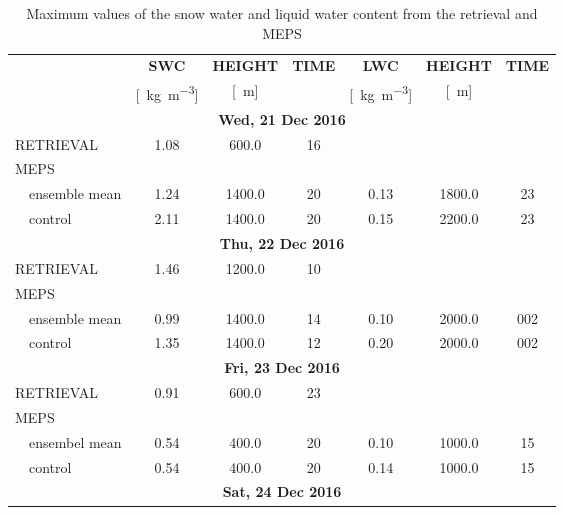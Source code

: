 \begin{table}[h!]
	\begin{center}
		\caption{Maximum values of the snow water and liquid water content from the retrieval and MEPS}\label{tab:max_val}
		\begin{tabular}{ll|c|c|c|c|c|c} 
			\hline \hline
			& & \textbf{SWC}  & \textbf{HEIGHT}  & \textbf{TIME} & \textbf{LWC}  & \textbf{HEIGHT}  & \textbf{TIME}  \\
			& & [\SI{}{\kg\per\cubic\meter}] & [\SI{}{\meter}] &  & [\SI{}{\kg\per\cubic\meter}] & [\SI{}{\meter}] &   \\
			\hline \hline
			\multicolumn{8}{c}{\textbf{Wed, 21 Dec 2016}} \\ \hline
			\multicolumn{2}{l|}{RETRIEVAL} & 1.08 & 600.0 & \SI{16}{\UTC} & & & \\
			\multicolumn{2}{l|}{MEPS} &  &  & & & & \\
			& ensemble mean & \num{1.24} & \num{1400.0} & \SI{20}{\UTC} & \num{0.13} & \num{1800.0} & \SI{23}{\UTC}\\
			& control & \num{2.11} & \num{1400.0} & \SI{20}{\UTC} & \num{0.15} & \num{2200.0} & \SI{23}{\UTC}\\ \hline \hline
			\multicolumn{8}{c}{\textbf{Thu, 22 Dec 2016}} \\ \hline
			\multicolumn{2}{l|}{RETRIEVAL} & \num{1.46} & \num{1200.0} & \SI{10}{\UTC} & & & \\
			\multicolumn{2}{l|}{MEPS} &  &  & & & & \\
			& ensemble mean & \num{0.99} & \num{1400.0} & \SI{14}{\UTC} & \num{0.10} & \num{2000.0} & 0\SI{02}{\UTC} \\ 
			& control & \num{1.35} & \num{1400.0} & \SI{12}{\UTC} & \num{0.20} & \num{2000.0} & 0\SI{02}{\UTC} \\ \hline \hline
			\multicolumn{8}{c}{\textbf{Fri, 23 Dec 2016}} \\ \hline
			\multicolumn{2}{l|}{RETRIEVAL} & \num{0.91} & \num{600.0} & \SI{23}{\UTC} & & & \\
			\multicolumn{2}{l|}{MEPS} &  &  & & & & \\
			& ensembel mean & \num{0.54} & \num{400.0} & \SI{20}{\UTC} & \num{0.10} & \num{1000.0} & \SI{15}{\UTC} \\
			& control & \num{0.54} & \num{400.0} & \SI{20}{\UTC} & \num{0.14} & \num{1000.0} & \SI{15}{\UTC} \\ \hline \hline
			\multicolumn{8}{c}{\textbf{Sat, 24 Dec 2016}} \\ \hline

\end{tabular}
\end{center}
\end{table}
